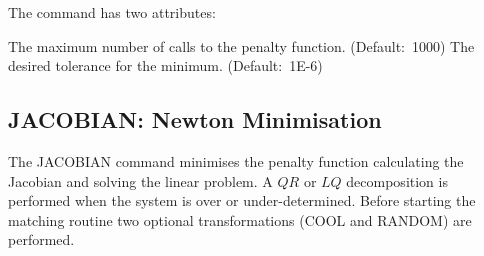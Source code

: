 
The command has two attributes: 
\begin{madlist}
    The maximum number of calls to the penalty
   function. (Default:~1000) 
    The desired tolerance for the minimum. 
   (Default:~1E-6)
\end{madlist} 

\subsection{JACOBIAN: Newton Minimisation}
\label{subsec:match_jacobian}
The JACOBIAN command minimises the penalty function calculating the
Jacobian and solving the linear problem. A $Q R$ or $L Q$  decomposition is
performed when the system is over or under-determined. Before starting
the matching routine two optional transformations (COOL and RANDOM) are
performed. 


